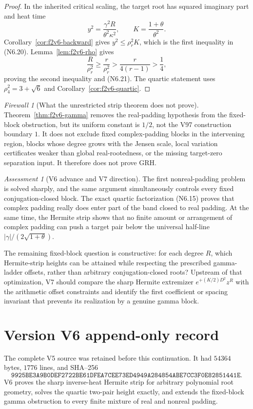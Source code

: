 \documentclass[11pt]{article}
\theoremstyle{definition}
\theoremstyle{remark}
\newtheorem{assessment}[theorem]{Assessment}
\newtheorem{firewall}[theorem]{Firewall}
\newcommand{\abs}[1]{\left\lvert #1\right\rvert}
\begin{document}
\begin{proof}
In the inherited critical scaling, the target root has squared imaginary
part and heat time
\[
 y^2=\frac{\gamma^2R}{\theta^2\kappa^2},
 \qquad
 K=\frac{1+\theta}{\theta^2}.
 \tag{N6.23}
\]
Corollary~\ref{cor:f2v6-backward} gives \(y^2\le\rho_r^2K\), which is the
first inequality in \textup{(N6.20)}.  Lemma~\ref{lem:f2v6-rho} gives
\[
 \frac{R}{\rho_r^2}\ge\frac{r}{\rho_r^2}>
 \frac{r}{4(r-1)}>\frac14,
 \tag{N6.24}
\]
proving the second inequality and \textup{(N6.21)}.  The quartic statement
uses \(\rho_4^2=3+\sqrt6\) and Corollary~\ref{cor:f2v6-quartic}.
\end{proof}

\begin{firewall}[What the unrestricted strip theorem does not prove]
Theorem~\ref{thm:f2v6-gamma} removes the real-padding hypothesis from the
fixed-block obstruction, but its uniform constant is \(1/2\), not the V97
construction boundary \(1\).  It does not exclude fixed complex-padding
blocks in the intervening region, blocks whose degree grows with the Jensen
scale, local variation certificates weaker than global real-rootedness, or
the missing target-zero separation input.  It therefore does not prove GRH.
\end{firewall}

\begin{assessment}[V6 advance and V7 direction]
The first nonreal-padding problem is solved sharply, and the same argument
simultaneously controls every fixed conjugation-closed block.  The exact
quartic factorization \textup{(N6.15)} proves that complex padding really
does enter part of the band closed to real padding.  At the same time, the
Hermite strip shows that no finite amount or arrangement of complex padding
can push a target pair below the universal half-line
\(\abs{\gamma}/(2\sqrt{1+\theta})\).

The remaining fixed-block question is constructive: for each degree \(R\),
which Hermite-strip heights can be attained while respecting the prescribed
gamma-ladder offsets, rather than arbitrary conjugation-closed roots?
Upstream of that optimization, V7 should compare the sharp Hermite extremizer
\(e^{+(K/2)D^2}z^R\) with the arithmetic offset constraints and identify the
first coefficient or spacing invariant that prevents its realization by a
genuine gamma block.
\end{assessment}

\section*{Version V6 append-only record}
The complete V5 source was retained before this continuation.  It had
\(54364\) bytes, \(1776\) lines, and SHA--256
\[
 \texttt{9925BE3A9B0DEF2722BE61DFEA7CEE73ED4949A284854ABE7CC3F0E82851441E}.
\]
V6 proves the sharp inverse-heat Hermite strip for arbitrary polynomial root
geometry, solves the quartic two-pair height exactly, and extends the
fixed-block gamma obstruction to every finite mixture of real and nonreal
padding.
\end{document}
